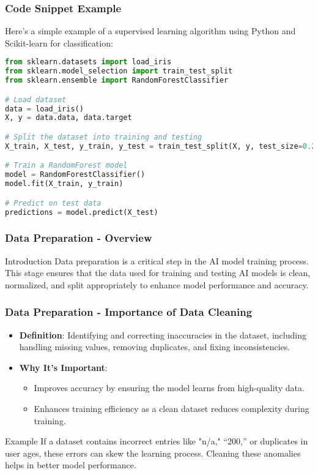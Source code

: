 \documentclass[aspectratio=169]{beamer}
\begin{document}
\begin{frame}[fragile]
    \frametitle{Code Snippet Example}
    Here’s a simple example of a supervised learning algorithm using Python and Scikit-learn for classification:
    \begin{lstlisting}[language=Python]
from sklearn.datasets import load_iris
from sklearn.model_selection import train_test_split
from sklearn.ensemble import RandomForestClassifier

# Load dataset
data = load_iris()
X, y = data.data, data.target

# Split the dataset into training and testing
X_train, X_test, y_train, y_test = train_test_split(X, y, test_size=0.2)

# Train a RandomForest model
model = RandomForestClassifier()
model.fit(X_train, y_train)

# Predict on test data
predictions = model.predict(X_test)
    \end{lstlisting}
\end{frame}

\begin{frame}[fragile]
    \frametitle{Data Preparation - Overview}
    \begin{block}{Introduction}
        Data preparation is a critical step in the AI model training process. This stage ensures that the data used for training and testing AI models is clean, normalized, and split appropriately to enhance model performance and accuracy.
    \end{block}
\end{frame}

\begin{frame}[fragile]
    \frametitle{Data Preparation - Importance of Data Cleaning}
    \begin{itemize}
        \item \textbf{Definition}: Identifying and correcting inaccuracies in the dataset, including handling missing values, removing duplicates, and fixing inconsistencies.
        \item \textbf{Why It's Important}:
        \begin{itemize}
            \item Improves accuracy by ensuring the model learns from high-quality data.
            \item Enhances training efficiency as a clean dataset reduces complexity during training.
        \end{itemize}
    \end{itemize}
    
    \begin{block}{Example}
        If a dataset contains incorrect entries like "n/a," “200,” or duplicates in user ages, these errors can skew the learning process. Cleaning these anomalies helps in better model performance.
    \end{block}
\end{frame}
\end{document}
